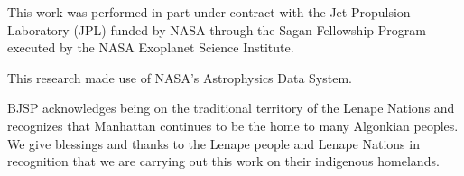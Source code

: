 \documentclass[modern]{aastex63}
\begin{document}
This work was performed in part under contract with the Jet Propulsion Laboratory (JPL) funded by NASA through the Sagan Fellowship Program executed by the NASA Exoplanet Science Institute. 

This research made use of NASA's Astrophysics Data System.

BJSP acknowledges being on the traditional territory of the Lenape Nations and recognizes that Manhattan continues to be the home to many Algonkian peoples. We give blessings and thanks to the Lenape people and Lenape Nations in recognition that we are carrying out this work on their indigenous homelands.
%








\end{document}
